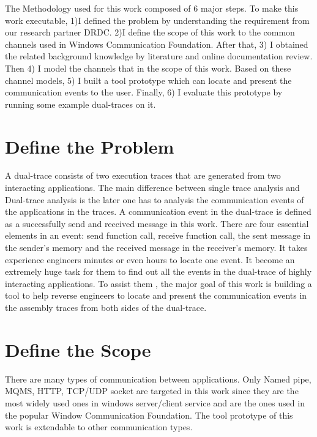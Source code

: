 The Methodology used for this work composed of 6 major steps. To make this work executable, 1)I defined the problem by understanding the requirement from our research partner DRDC.  2)I define the scope of this work to the common channels used in Windows Communication Foundation. After that, 3) I obtained the related background knowledge by literature and online documentation review. Then 4) I model the channels that in the scope of this work. Based on these channel models, 5) I built a tool prototype which can locate and present the communication events to the user. Finally, 6) I evaluate this prototype by running some example dual-traces on it.

\label{chapter:problem}

\newlength{\savedunitlength}
\setlength{\unitlength}{2em}
\section{Define the Problem}
A dual-trace consists of two execution traces that are generated from two interacting applications. The main difference between single trace analysis and Dual-trace analysis is the later one has to analysis the communication events of the applications in the traces. A communication event in the dual-trace is defined as a successfully send and received message in this work. There are four essential elements in an event: send function call, receive function call, the sent message in the sender's memory and the received message in the receiver's memory. It takes experience engineers minutes or even hours to locate one event. It become an extremely huge task for them to find out all the events in the dual-trace of highly interacting applications. To assist them , the major goal of this work is building a tool to help reverse engineers to locate and present the communication events in the assembly traces from both sides of the dual-trace. 


\section{Define the Scope}
There are many types of communication between applications. Only Named pipe, MQMS, HTTP, TCP/UDP socket are targeted in this work since they are the most widely used ones in windows server/client service and are the ones used in the popular Window Communication Foundation. The tool prototype of this work is extendable to other communication types.

